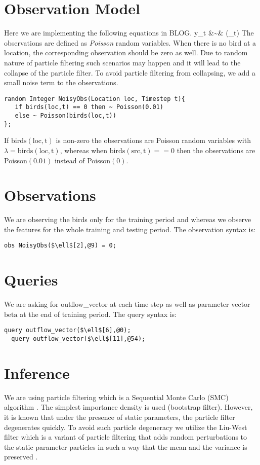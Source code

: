 \documentclass[11pt]{article}
\begin{document}
\section{Observation Model}
Here we are implementing the following equations in BLOG.
\beq
	y_t &\sim& (_t)
\eeq
The observations are defined as \emph{Poisson} random variables. When there is no bird at a location, the corresponding observation should be zero as well. Due to random nature of particle filtering such scenarios may happen and it will lead to the collapse of the particle filter. To avoid particle filtering from collapsing, we add a small noise term to the observations.
\begin{lstlisting}
random Integer NoisyObs(Location loc, Timestep t){
   if birds(loc,t) == 0 then ~ Poisson(0.01)
   else ~ Poisson(birds(loc,t))
};
\end{lstlisting}
If $\mathrm{birds(loc,t)}$ is non-zero the observations are Poisson random variables with $\lambda = \mathrm{birds(loc,t)}$, whereas when $\mathrm{birds(src,t)}==0$ then the observations are Poisson$(0.01)$ instead of Poisson$(0)$.

\section{Observations}
We are observing the birds only for the training period and whereas we observe the features for the whole training and testing period. The observation syntax is:
\begin{lstlisting}[mathescape]
  obs NoisyObs($\ell$[2],@9) = 0;
\end{lstlisting}

\section{Queries}
We are asking for outflow\_vector at each time step as well as parameter vector $\mathrm{beta}$ at the end of training period. The query syntax is:
\begin{lstlisting}[mathescape]
  query outflow_vector($\ell$[6],@0);
  query outflow_vector($\ell$[11],@54);
\end{lstlisting}

\section{Inference}
We are using particle filtering which is a Sequential Monte Carlo (SMC) algorithm \cite{doucet2011tutorial}. The simplest importance density is used (bootstrap filter). However, it is known that under the presence of static parameters, the particle filter degenerates quickly. To avoid such particle degeneracy we utilize the Liu-West filter which is a variant of particle filtering that adds random perturbations to the static parameter particles in such a way that the mean and the variance is preserved  \cite{liu2001combined}.
\end{document}

